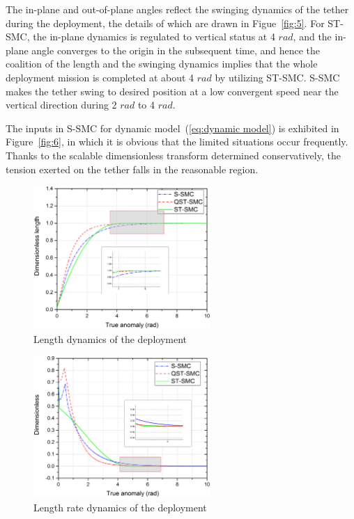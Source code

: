 \documentclass[Journal,letterpaper]{ascelike-new}
\theoremstyle{plain}
\theoremstyle{remark}
\begin{document}
The in-plane and out-of-plane angles reflect the swinging dynamics of the tether during the deployment, the details of which are drawn in Figue~\ref{fig:5}. For ST-SMC, the in-plane dynamics is regulated to vertical status at 4 $rad$, and the in-plane angle converges to the origin in the subsequent time, and hence the coalition of the length and the swinging dynamics implies that the whole deployment mission is completed at about 4 $rad$ by utilizing ST-SMC. S-SMC makes the tether swing to desired position at a low convergent speed near the vertical direction during 2 $rad$ to 4 $rad$.\par
The inputs in S-SMC for dynamic model~(\ref{eq:dynamic model}) is exhibited in Figure~\ref{fig:6}, in which it is obvious that the limited situations occur frequently. Thanks to the scalable dimensionless transform determined conservatively, the tension exerted on the tether falls in the reasonable region.
\begin{figure}
\centering
\includegraphics[width=0.6\textwidth]{paper4_fig3.eps}
\caption{Length dynamics of the deployment}
\label{fig:3}
\end{figure}
\begin{figure}
\centering
\includegraphics[width=0.6\textwidth]{paper4_fig4.eps}
\caption{Length rate dynamics of the deployment}
\label{fig:4}
\end{figure}
\end{document}
